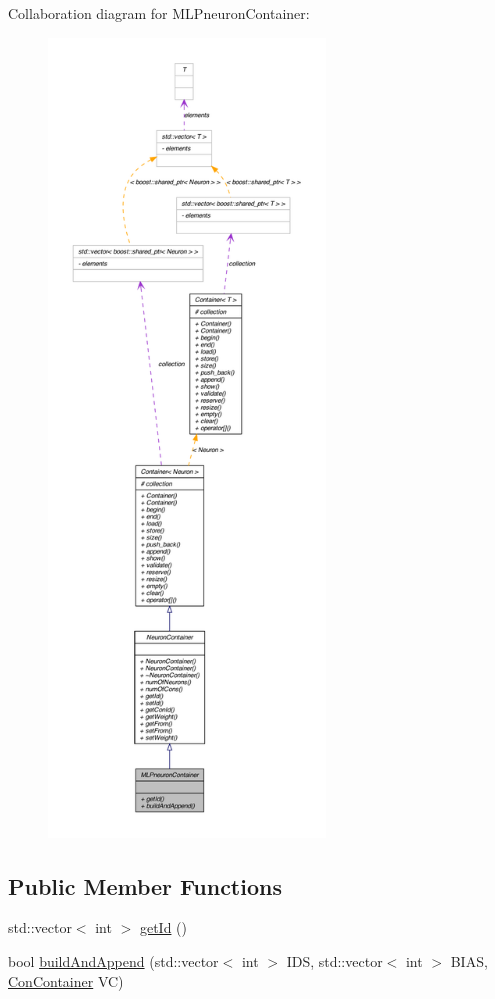 Collaboration diagram for MLPneuronContainer:\nopagebreak
\begin{figure}[H]
\begin{center}
\leavevmode
\includegraphics[height=600pt]{class_m_l_pneuron_container__coll__graph}
\end{center}
\end{figure}
\subsection*{Public Member Functions}
\begin{DoxyCompactItemize}
\item 
std::vector$<$ int $>$ \hyperlink{class_m_l_pneuron_container_a91f7def6fa9ee973b95f673642b2c586}{getId} ()
\item 
bool \hyperlink{class_m_l_pneuron_container_a98391f4cc53bb177c7abd0ff023f3cb0}{buildAndAppend} (std::vector$<$ int $>$ IDS, std::vector$<$ int $>$ BIAS, \hyperlink{class_con_container}{ConContainer} VC)
\end{DoxyCompactItemize}


